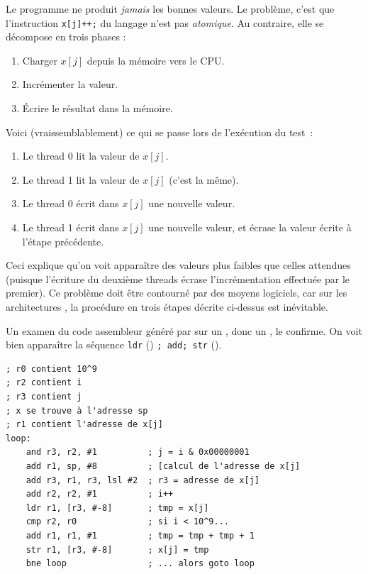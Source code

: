 Le programme ne produit \emph{jamais} les bonnes valeurs. Le problème, c'est que
l'instruction \texttt{x[j]++;} du langage  n'est pas
\emph{atomique}. Au contraire, elle se décompose en trois phases :
\begin{enumerate}
\item Charger $x[j]$ depuis la mémoire vers le CPU.
\item Incrémenter la valeur.
\item Écrire le résultat dans la mémoire.
\end{enumerate}

Voici (vraissemblablement) ce qui se passe lors de l'exécution du test~:
\begin{enumerate}  
\item Le thread 0 lit la valeur de $x[j]$.
\item Le thread 1 lit la valeur de $x[j]$ (c'est la même).
\item Le thread 0 écrit dans $x[j]$ une nouvelle valeur.
\item Le thread 1 écrit dans $x[j]$ une nouvelle valeur, et écrase la valeur écrite à l'étape précédente.
\end{enumerate}

Ceci explique qu'on voit apparaître des valeurs plus faibles que
celles attendues (puisque l'écriture du deuxième threads \og écrase\fg
l'incrémentation effectuée par le premier). Ce problème doit être
contourné par des moyens logiciels, car sur les architectures
, la procédure en trois étapes décrite ci-dessus
est inévitable.

\begin{danger}
  \footnotesize
  Un examen du code assembleur généré par  sur un
  , donc un , le confirme. On voit bien
  apparaître la séquence \texttt{ldr} () \texttt{;
    add; str} ().
\begin{myfilet}
\begin{verbatim}
; r0 contient 10^9
; r2 contient i
; r3 contient j
; x se trouve à l'adresse sp
; r1 contient l'adresse de x[j]
loop:
	and	r3, r2, #1          ; j = i & 0x00000001
	add	r1, sp, #8          ; [calcul de l'adresse de x[j]
	add	r3, r1, r3, lsl #2  ; r3 = adresse de x[j]
	add	r2, r2, #1          ; i++
	ldr	r1, [r3, #-8]       ; tmp = x[j]
	cmp	r2, r0              ; si i < 10^9...
	add	r1, r1, #1          ; tmp = tmp + tmp + 1
	str	r1, [r3, #-8]       ; x[j] = tmp
	bne	loop                ; ... alors goto loop
\end{verbatim}
\end{myfilet}
\end{danger}

